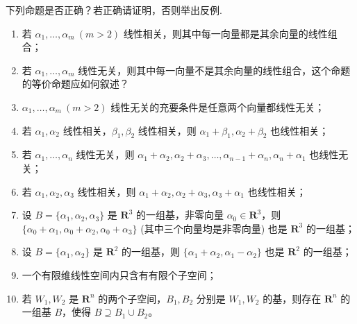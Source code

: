 \begin{exercise}

    \begin{exgroup}
        \item 下列命题是否正确？若正确请证明，否则举出反例.
        \begin{enumerate}
            \item 若 $\alpha_1, \ldots, \alpha_m \ (m > 2)$ 线性相关，则其中每一向量都是其余向量的线性组合；

            \item 若 $\alpha_1, \ldots, \alpha_m$ 线性无关，则其中每一向量不是其余向量的线性组合，这个命题的等价命题应如何叙述？

            \item $\alpha_1, \ldots, \alpha_m \ (m > 2)$ 线性无关的充要条件是任意两个向量都线性无关；

            \item  若 $\alpha_1, \alpha_2$ 线性相关，$ \beta_1, \beta_2$ 线性相关，则 $\alpha_1 + \beta_1, \alpha_2 + \beta_2$ 也线性相关；

            \item 若 $\alpha_1, \ldots, \alpha_n$ 线性无关，则 $\alpha_1 + \alpha_2, \alpha_2 + \alpha_3, \ldots, \alpha_{n-1} + \alpha_n, \alpha_n + \alpha_1$ 也线性无关；

            \item 若 $\alpha_1, \alpha_2, \alpha_3$ 线性相关，则 $\alpha_1 + \alpha_2, \alpha_2 + \alpha_3, \alpha_3 + \alpha_1$ 也线性相关；

            \item 设 $B = \{\alpha_1, \alpha_2, \alpha_3\}$ 是 $ \mathbf{R}^3 $ 的一组基，非零向量 $\alpha_0 \in \mathbf{R}^3$，则 $\{\alpha_0 + \alpha_1, \alpha_0 + \alpha_2, \alpha_0 + \alpha_3\}$ (其中三个向量均是非零向量) 也是 $\mathbf{R}^3$ 的一组基；

            \item  设 $B = \{\alpha_1, \alpha_2\}$ 是 $\mathbf{R}^2$ 的一组基，则 $\{\alpha_1 + \alpha_2, \alpha_1 - \alpha_2\}$ 也是 $\mathbf{R}^2$ 的一组基；

            \item 一个有限维线性空间内只含有有限个子空间；

            \item  若 $W_1, W_2$ 是 $ \mathbf{R}^n $ 的两个子空间，$B_1, B_2$ 分别是 $W_1, W_2$ 的基，则存在 $ \mathbf{R}^n $ 的一组基 $B$，使得 $B \supseteq B_1 \cup B_2$。


\end{enumerate}
\end{exgroup}
\end{exercise}
